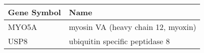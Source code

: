 \begin{tabular}{ll}
\toprule
Gene Symbol &                               Name \\
\midrule
      MYO5A & myosin VA (heavy chain 12, myoxin) \\
       USP8 &     ubiquitin specific peptidase 8 \\
\bottomrule
\end{tabular}
